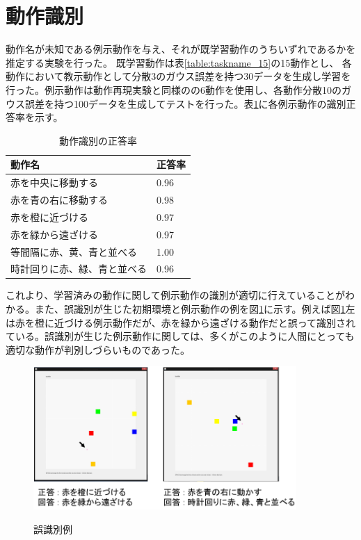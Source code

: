 \section{動作識別}

動作名が未知である例示動作を与え、それが既学習動作のうちいずれであるかを推定する実験を行った。
既学習動作は表\ref{table:taskname_15}の15動作とし、
各動作において教示動作として分散3のガウス誤差を持つ30データを生成し学習を行った。例示動作は動作再現実験と同様のの6動作を使用し、各動作分散10のガウス誤差を持つ100データを生成してテストを行った。表\ref{table:result}に各例示動作の識別正答率を示す。
\begin{table}[h]
	\caption{動作識別の正答率}
	\label{table:result}
  	\begin{tabular}{|l|l|} \hline
    	動作名 & 正答率\\ \hline
   	赤を中央に移動する 		& 0.96
    	\\
    	赤を青の右に移動する 		& 0.98
    	\\
    	赤を橙に近づける 			& 0.97
    	\\
    	赤を緑から遠ざける 			& 0.97
    	\\
    	等間隔に赤、黄、青と並べる 	& 1.00
    	\\
    	時計回りに赤、緑、青と並べる 	& 0.96
    	\\ \hline
  	\end{tabular}
\end{table}
これより、学習済みの動作に関して例示動作の識別が適切に行えていることがわかる。また、誤識別が生じた初期環境と例示動作の例を図\ref{figure:failure}に示す。例えば図\ref{figure:failure}左は赤を橙に近づける例示動作だが、赤を緑から遠ざける動作だと誤って識別されている。誤識別が生じた例示動作に関しては、多くがこのように人間にとっても適切な動作が判別しづらいものであった。



	\begin{figure}[h]
		\begin{center}
			\includegraphics[width=10cm]{figure4.png} \\ %
			\caption{誤識別例}
			\label{figure:failure}
		\end{center}
	\end{figure}

